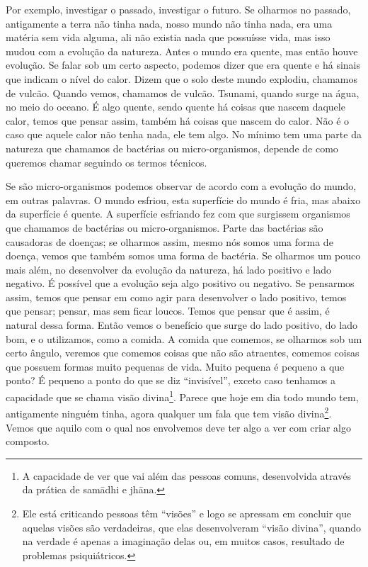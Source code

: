 Por exemplo, investigar o passado, investigar o futuro. Se olharmos
no passado, antigamente a terra não tinha nada, nosso mundo não tinha
nada, era uma matéria sem vida alguma, ali não existia nada que
possuísse vida, mas isso mudou com a evolução da natureza. Antes o
mundo era quente, mas então houve evolução. Se falar sob um certo
aspecto, podemos dizer que era quente e há sinais que indicam o nível
do calor. Dizem que o solo deste mundo explodiu, chamamos de vulcão.
Quando vemos, chamamos de vulcão. Tsunami, quando surge na água, no
meio do oceano. É algo quente, sendo quente há coisas que nascem
daquele calor, temos que pensar assim, também há coisas que nascem do
calor. Não é o caso que aquele calor não tenha nada, ele tem algo. No
mínimo tem uma parte da natureza que chamamos de bactérias ou
micro-organismos, depende de como queremos chamar
seguindo os termos técnicos. 

Se são micro-organismos podemos observar de acordo com a evolução do
mundo, em outras palavras. O mundo esfriou, esta superfície do mundo é
fria, mas abaixo da superfície é quente. A superfície esfriando fez com
que surgissem organismos que chamamos de bactérias ou micro-organismos.
Parte das bactérias são causadoras de doenças; se olharmos assim, mesmo
nós somos uma forma de doença, vemos que também somos uma forma de
bactéria. Se olharmos um pouco mais além, no desenvolver da evolução da
natureza, há lado positivo e lado negativo. É possível que a evolução
seja algo positivo ou negativo. Se pensarmos
assim, temos que pensar em como agir para desenvolver o lado positivo,
temos que pensar; pensar, mas sem ficar loucos. Temos que pensar que é
assim, é natural dessa forma. Então vemos o benefício que surge do lado
positivo, do lado bom, e o utilizamos, como a comida. A comida que
comemos, se olharmos sob um certo ângulo, veremos que comemos coisas
que não são atraentes, comemos coisas que possuem formas muito pequenas
de vida. Muito pequena é pequeno a que ponto? É pequeno a ponto do que
se diz “invisível”, exceto caso tenhamos a capacidade que se chama
visão divina\footnote{A capacidade de ver que vai além das pessoas
comuns, desenvolvida através da prática de samādhi e jhāna.}.
Parece que hoje em dia todo mundo tem, antigamente ninguém tinha, agora
qualquer um fala que tem visão divina\footnote{Ele está criticando
pessoas têm “visões” e logo se apressam em concluir que aquelas visões
são verdadeiras, que elas desenvolveram “visão divina”, quando na
verdade é apenas a imaginação delas ou, em muitos casos, resultado de
problemas psiquiátricos. }. Vemos que aquilo com o qual nos envolvemos
deve ter algo a ver com criar algo composto.


